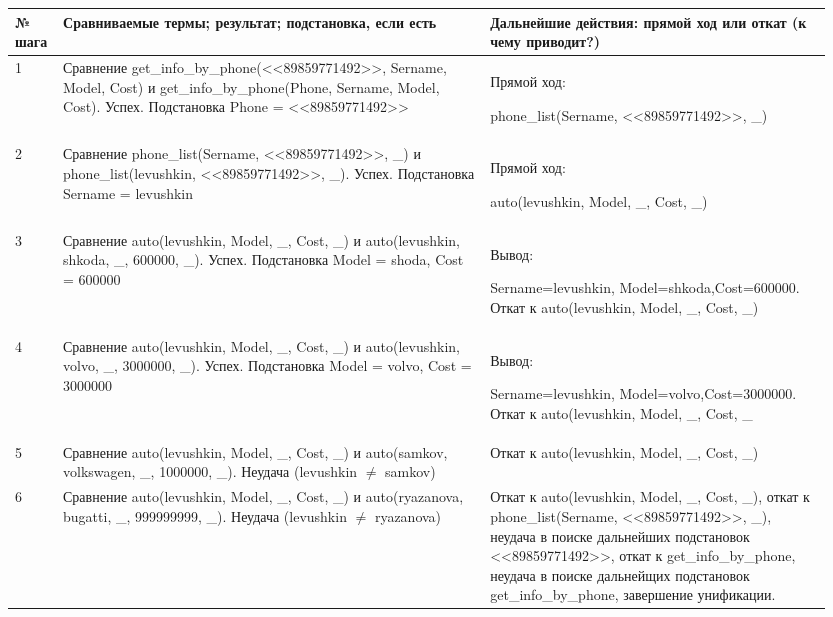 \documentclass[a4paper,12pt]{article}
\begin{document}
	\begin{table} [h!]
		\begin{center}
			\begin{tabular}{|p{0.05\linewidth}|p{0.5\linewidth}|p{ 0.4\linewidth}|}
				\hline
				{\bf  № шага} & {\bf Сравниваемые термы; результат; подстановка, если есть} & {\bf Дальнейшие действия: прямой ход или откат (к чему приводит?)} \\
				\hline
				{1} & {Сравнение get\_info\_by\_phone(<<89859771492>>, Sername, Model, Cost) и get\_info\_by\_phone(Phone, Sername, Model, Cost). Успех. Подстановка Phone = <<89859771492>>} & {Прямой ход:
					
					 phone\_list(Sername, <<89859771492>>, \_)}\\
				\hline
				{2} & {Сравнение phone\_list(Sername, <<89859771492>>, \_) и phone\_list(levushkin, <<89859771492>>, \_). Успех. Подстановка Sername = levushkin} & {Прямой ход: 
					
					 auto(levushkin, Model, \_, Cost, \_)}\\
				\hline
				{3} & {Сравнение auto(levushkin, Model, \_, Cost, \_) и auto(levushkin, shkoda, \_, 600000, \_). Успех. Подстановка Model = shoda, Cost = 600000} & {Вывод: 
					
					 Sername=levushkin, Model=shkoda,Cost=600000. Откат к auto(levushkin, Model, \_, Cost, \_)}\\
				\hline
				{4} & {Сравнение auto(levushkin, Model, \_, Cost, \_) и auto(levushkin, volvo, \_, 3000000, \_). Успех. Подстановка Model = volvo, Cost = 3000000} & {Вывод:
					
					 Sername=levushkin, Model=volvo,Cost=3000000. Откат к auto(levushkin, Model, \_, Cost, \_}\\
				\hline
				{5} & {Сравнение auto(levushkin, Model, \_, Cost, \_) и auto(samkov, volkswagen, \_, 1000000, \_). Неудача (levushkin $\neq$ samkov)} & {Откат к auto(levushkin, Model, \_, Cost, \_)}\\
				\hline
				{6} & {Сравнение auto(levushkin, Model, \_, Cost, \_) и auto(ryazanova, bugatti, \_, 999999999, \_). Неудача (levushkin $\neq$ ryazanova)} & {Откат к auto(levushkin, Model, \_, Cost, \_), откат к phone\_list(Sername, <<89859771492>>, \_), неудача в поиске дальнейших подстановок <<89859771492>>, откат к get\_info\_by\_phone, неудача в поиске дальнейщих подстановок get\_info\_by\_phone, завершение унификации.}\\
				\hline
			\end{tabular}  
			\label{m1}
		\end{center}
	\end{table}
\end{document}
